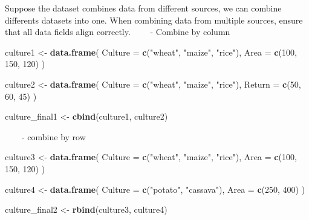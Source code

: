 \documentclass[
]{book}
\newenvironment{Shaded}{\begin{snugshade}}{\end{snugshade}}
\newcommand{\AttributeTok}[1]{\textcolor[rgb]{0.13,0.29,0.53}{#1}}
\newcommand{\DecValTok}[1]{\textcolor[rgb]{0.00,0.00,0.81}{#1}}
\newcommand{\FunctionTok}[1]{\textcolor[rgb]{0.13,0.29,0.53}{\textbf{#1}}}
\newcommand{\NormalTok}[1]{#1}
\newcommand{\OtherTok}[1]{\textcolor[rgb]{0.56,0.35,0.01}{#1}}
\newcommand{\StringTok}[1]{\textcolor[rgb]{0.31,0.60,0.02}{#1}}
\begin{document}
Suppose the dataset combines data from different sources, we can combine differents datasets into one. When combining data from multiple sources, ensure that all data fields align correctly.
~~~~- Combine by column

\begin{Shaded}
\begin{Highlighting}[]
\NormalTok{culture1 }\OtherTok{\textless{}{-}} \FunctionTok{data.frame}\NormalTok{(}
  \AttributeTok{Culture =} \FunctionTok{c}\NormalTok{(}\StringTok{"wheat"}\NormalTok{, }\StringTok{"maize"}\NormalTok{, }\StringTok{"rice"}\NormalTok{),}
  \AttributeTok{Area =} \FunctionTok{c}\NormalTok{(}\DecValTok{100}\NormalTok{, }\DecValTok{150}\NormalTok{, }\DecValTok{120}\NormalTok{)}
\NormalTok{)}

\NormalTok{culture2 }\OtherTok{\textless{}{-}} \FunctionTok{data.frame}\NormalTok{(}
  \AttributeTok{Culture =} \FunctionTok{c}\NormalTok{(}\StringTok{"wheat"}\NormalTok{, }\StringTok{"maize"}\NormalTok{, }\StringTok{"rice"}\NormalTok{),}
  \AttributeTok{Return =} \FunctionTok{c}\NormalTok{(}\DecValTok{50}\NormalTok{, }\DecValTok{60}\NormalTok{, }\DecValTok{45}\NormalTok{)}
\NormalTok{)}

\NormalTok{culture\_final1 }\OtherTok{\textless{}{-}} \FunctionTok{cbind}\NormalTok{(culture1, culture2)}
\end{Highlighting}
\end{Shaded}

~~~~- combine by row

\begin{Shaded}
\begin{Highlighting}[]
\NormalTok{culture3 }\OtherTok{\textless{}{-}} \FunctionTok{data.frame}\NormalTok{(}
  \AttributeTok{Culture =} \FunctionTok{c}\NormalTok{(}\StringTok{"wheat"}\NormalTok{, }\StringTok{"maize"}\NormalTok{, }\StringTok{"rice"}\NormalTok{),}
  \AttributeTok{Area =} \FunctionTok{c}\NormalTok{(}\DecValTok{100}\NormalTok{, }\DecValTok{150}\NormalTok{, }\DecValTok{120}\NormalTok{)}
\NormalTok{)}

\NormalTok{culture4 }\OtherTok{\textless{}{-}} \FunctionTok{data.frame}\NormalTok{(}
  \AttributeTok{Culture =} \FunctionTok{c}\NormalTok{(}\StringTok{"potato"}\NormalTok{, }\StringTok{"cassava"}\NormalTok{),}
  \AttributeTok{Area =} \FunctionTok{c}\NormalTok{(}\DecValTok{250}\NormalTok{, }\DecValTok{400}\NormalTok{)}
\NormalTok{)}

\NormalTok{culture\_final2 }\OtherTok{\textless{}{-}} \FunctionTok{rbind}\NormalTok{(culture3, culture4)}
\end{Highlighting}
\end{Shaded}
\end{document}
